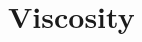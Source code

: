 \documentclass[9pt,bestpractices]{livecoms}
\begin{document}



\section{Viscosity} \label{sec:Viscosity}


\end{document}
